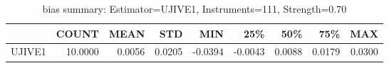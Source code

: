 \begin{table}[ht]
\centering
\caption{bias summary: Estimator=UJIVE1, Instruments=111, Strength=0.70}
\begin{tabular}{lrrrrrrrr}
\toprule
 & COUNT & MEAN & STD & MIN & 25\% & 50\% & 75\% & MAX \\
\midrule
UJIVE1 & 10.0000 & 0.0056 & 0.0205 & -0.0394 & -0.0043 & 0.0088 & 0.0179 & 0.0300 \\
\bottomrule
\end{tabular}
\end{table}
